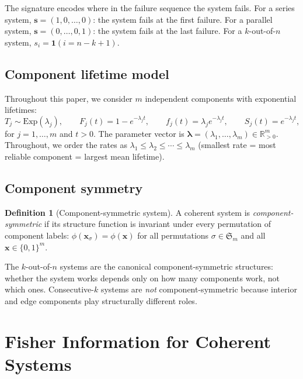 \documentclass[12pt]{article}
\theoremstyle{definition}
\newtheorem{definition}[theorem]{Definition}
\theoremstyle{remark}
\newcommand{\Rset}{\mathbb{R}}
\newcommand{\blam}{\boldsymbol{\lambda}}
\begin{document}
The signature encodes where in the failure sequence the system fails.
For a series system, $\mathbf{s} = (1, 0, \ldots, 0)$: the system
fails at the first failure.  For a parallel system,
$\mathbf{s} = (0, \ldots, 0, 1)$: the system fails at the last
failure.  For a $k$-out-of-$n$ system,
$s_i = \mathbf{1}(i = n - k + 1)$.

\subsection{Component lifetime model}
\label{sec:component-model}

Throughout this paper, we consider $m$ independent components with
exponential lifetimes:
\begin{equation}\label{eq:component-exp}
  T_j \sim \mathrm{Exp}(\lambda_j), \qquad
  F_j(t) = 1 - e^{-\lambda_j t}, \qquad
  f_j(t) = \lambda_j e^{-\lambda_j t}, \qquad
  S_j(t) = e^{-\lambda_j t},
\end{equation}
for $j = 1, \ldots, m$ and $t > 0$.  The parameter vector is
$\blam = (\lambda_1, \ldots, \lambda_m) \in \Rset_{>0}^m$.
Throughout, we order the rates as
$\lambda_1 \leq \lambda_2 \leq \cdots \leq \lambda_m$
(smallest rate = most reliable component = largest mean lifetime).

\subsection{Component symmetry}
\label{sec:symmetry-def}

\begin{definition}[Component-symmetric system]
\label{def:component-symmetric}
A coherent system is \emph{component-symmetric} if its structure
function is invariant under every permutation of component labels:
$\phi(\mathbf{x}_{\sigma}) = \phi(\mathbf{x})$ for all permutations
$\sigma \in \mathfrak{S}_m$ and all $\mathbf{x} \in \{0,1\}^m$.
\end{definition}

The $k$-out-of-$n$ systems are the canonical component-symmetric
structures: whether the system works depends only on how many
components work, not which ones.  Consecutive-$k$ systems are
\emph{not} component-symmetric because interior and edge components
play structurally different roles.


\section{Fisher Information for Coherent Systems}
\label{sec:fisher}
\end{document}
